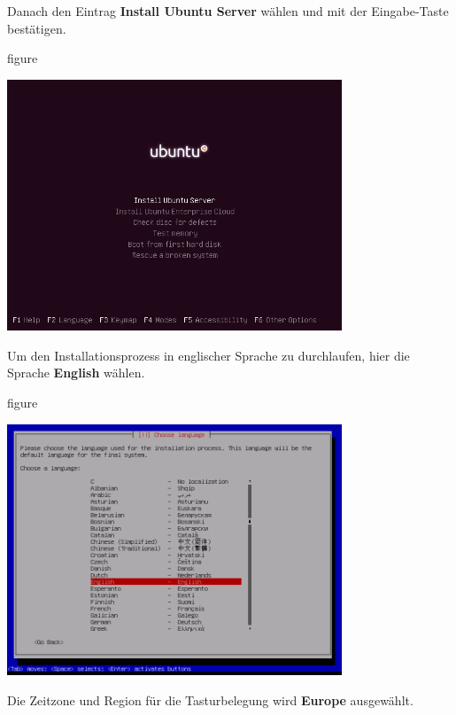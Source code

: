 Danach den Eintrag \textbf{Install Ubuntu Server} wählen und mit der
Eingabe-Taste bestätigen.

\begin{nofloat}{figure}
\begin{center}
\includegraphics[width=0.75\textwidth]{screenshots/02_ubuntu_install.png}
\end{center}
\end{nofloat}

Um den Installationsprozess in englischer Sprache zu durchlaufen, hier die
Sprache \textbf{English} wählen.

\begin{nofloat}{figure}
\begin{center}
\includegraphics[width=0.75\textwidth]{screenshots/03_ubuntu_install.png}
\end{center}
\end{nofloat}

Die Zeitzone und Region für die Tasturbelegung wird \textbf{Europe} ausgewählt.

